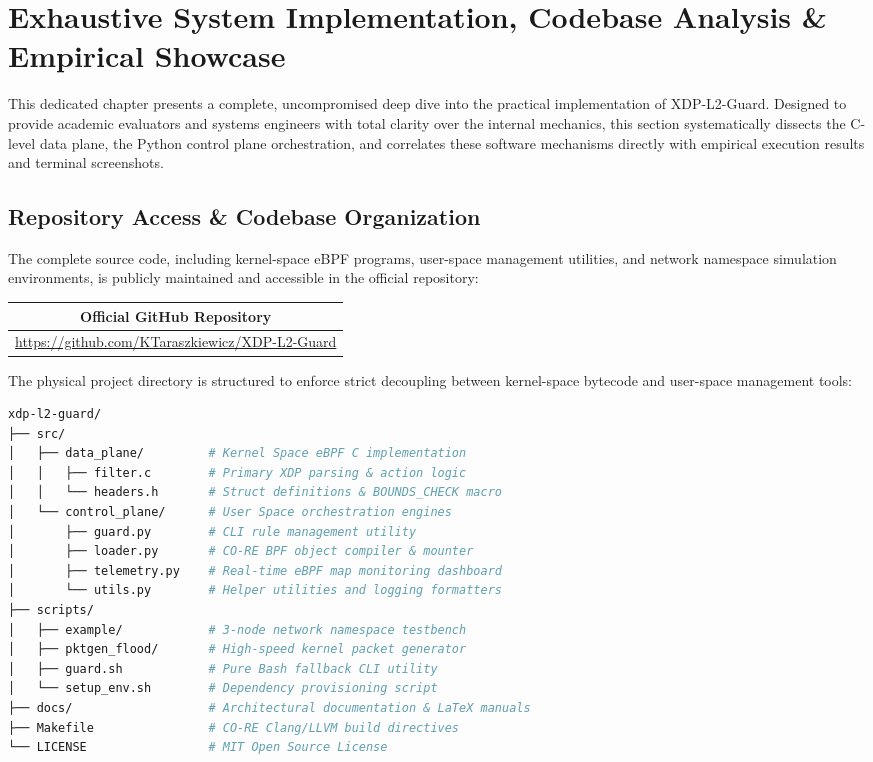 \documentclass[11pt,a4paper]{article}
\begin{document}
\newpage
\color{black} 

\section{Exhaustive System Implementation, Codebase Analysis \& Empirical Showcase}

This dedicated chapter presents a complete, uncompromised deep dive into the practical implementation of XDP-L2-Guard.
Designed to provide academic evaluators and systems engineers with total clarity over the internal mechanics, this section systematically dissects the C-level data plane, the Python control plane orchestration, and correlates these software mechanisms directly with empirical execution results and terminal screenshots.

\subsection{Repository Access \& Codebase Organization}

The complete source code, including kernel-space eBPF programs, user-space management utilities, and network namespace simulation environments, is publicly maintained and accessible in the official repository:

\vspace{0.5cm}
\begin{table}[H]
\centering
\begin{tabular}{|c|}
\hline
\textbf{Official GitHub Repository} \\
\hline
\url{https://github.com/KTaraszkiewicz/XDP-L2-Guard} \\
\hline
\end{tabular}
\end{table}
\vspace{0.5cm}

\noindent The physical project directory is structured to enforce strict decoupling between kernel-space bytecode and user-space management tools:

\begin{lstlisting}[language=bash, title={Project File Directory Layout}, breaklines=false, basicstyle=\ttfamily\scriptsize]
xdp-l2-guard/
├── src/
│   ├── data_plane/         # Kernel Space eBPF C implementation
│   │   ├── filter.c        # Primary XDP parsing & action logic
│   │   └── headers.h       # Struct definitions & BOUNDS_CHECK macro
│   └── control_plane/      # User Space orchestration engines
│       ├── guard.py        # CLI rule management utility
│       ├── loader.py       # CO-RE BPF object compiler & mounter
│       ├── telemetry.py    # Real-time eBPF map monitoring dashboard
│       └── utils.py        # Helper utilities and logging formatters
├── scripts/
│   ├── example/            # 3-node network namespace testbench
│   ├── pktgen_flood/       # High-speed kernel packet generator
│   ├── guard.sh            # Pure Bash fallback CLI utility
│   └── setup_env.sh        # Dependency provisioning script
├── docs/                   # Architectural documentation & LaTeX manuals
├── Makefile                # CO-RE Clang/LLVM build directives
└── LICENSE                 # MIT Open Source License
\end{lstlisting}
\end{document}
